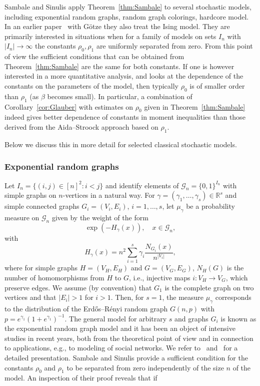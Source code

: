 \documentclass[a4paper]{amsart}
\theoremstyle{definition}
\theoremstyle{remark}
\numberwithin{equation}{section}
\newcommand*{\RR}{\mathbb{R}}
\begin{document}
Sambale and Sinulis apply Theorem~\ref{thm:Sambale} to several stochastic models, including exponential random graphs, random graph colorings, hardcore model. 
In an earlier paper~\cite{gtze2018concentration} with G\"otze they also treat the Ising model.  
They are primarily interested in situations when for a family of models on sets $I_n$ with $|I_n|\to \infty$ the constants $\rho_0,\rho_1$ are uniformly separated from zero. 
From this point of view the sufficient conditions that can be obtained from Theorem~\ref{thm:Sambale} are the same for both constants. 
If one is however interested in a more quantitative analysis, and looks at the dependence of the constants on the parameters of the model, then typically $\rho_0$ is of smaller order than $\rho_1$ (as $\beta$ becomes small). 
In particular, a combination of Corollary~\ref{cor:Glauber} with estimates on $\rho_0$ given in Theorem~\ref{thm:Sambale} indeed gives better dependence of constants in moment inequalities than those derived from the Aida--Stroock approach based on $\rho_1$.

Below we discuss this in more detail for selected classical stochastic models.

\medskip

\subsubsection{Exponential random graphs} Let $I_n = \{(i,j)\in [n]^2\colon i < j\}$ and identify elements of $\mathcal{G}_n = \{0,1\}^{I_n}$ with simple graphs on $n$-vertices in a natural way. For $\gamma = (\gamma_1,\ldots,\gamma_s) \in \RR^s$ and simple connected graphs $G_i = (V_i,E_i)$, $i=1,\ldots,s$, let $\mu_\gamma$ be a probability measure on $\mathcal{G}_n$ given by the weight of the form
    \begin{displaymath}
      \exp(-H_\gamma(x)), \quad x\in \mathcal{G}_n,
    \end{displaymath}
    with
    \begin{displaymath}
    H_\gamma(x) = n^2 \sum_{i=1}^s \gamma_i \frac{N_{G_i}(x)}{n^{|V_i|}},
    \end{displaymath}
    where for simple graphs $H = (V_H,E_H)$ and $G= (V_G,E_G)$, $N_{H}(G)$ is the number of homomorphisms from $H$ to $G$, i.e., injective maps $i\colon V_H\to V_G$, which preserve edges. We assume (by convention) that $G_1$ is the complete graph on two vertices and that $|E_i| > 1$ for $i > 1$. Then, for $s=1$, the measure $\mu_\gamma$ corresponds to the distribution of the Erd\H{o}s--R\'enyi random graph $G(n,p)$ with $p = e^{\gamma_1}(1+e^{\gamma_1})^{-1}$. The general model for arbitrary $s$ and graphs $G_i$ is known as the exponential random graph model and it has been an object of intensive studies in recent years, both from the theoretical point of view and in connection to applications, e.g., to modeling of social networks. We refer to~\cite{MR3544262} and~\cite{MR3127871} for a detailed presentation. Sambale and Sinulis provide a sufficient condition for the constants $\rho_0$ and $\rho_1$ to be separated from zero independently of the size $n$ of the model. An inspection of their proof
 reveals that if
\end{document}
